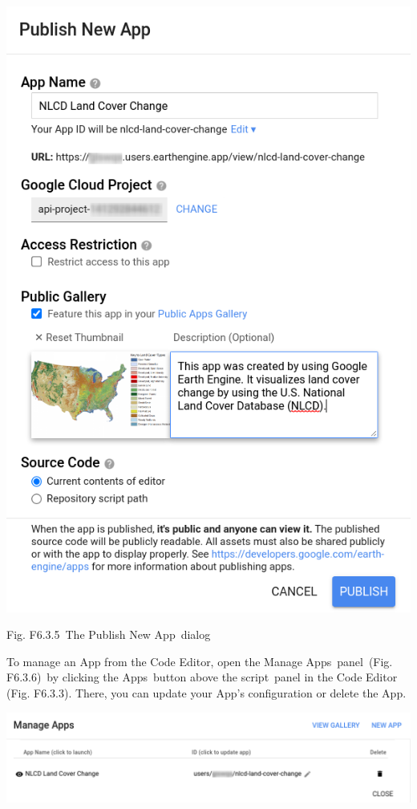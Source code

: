 \documentclass[
  letterpaper,
  DIV=11,
  numbers=noendperiod]{scrreprt}
\begin{document}
\includegraphics{./F6/image37.png}

Fig. F6.3.5~The Publish New App~dialog

To manage an App from the Code Editor, open the Manage Apps~panel~(Fig.
F6.3.6)~by clicking the Apps~button above the script~panel in the Code
Editor (Fig. F6.3.3). There, you can update your App's configuration or
delete the App.

\includegraphics{./F6/image65.png}
\end{document}
